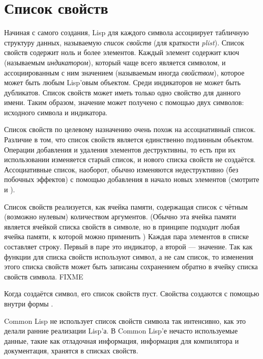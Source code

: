 \section{Список свойств}

Начиная с самого создания, Lisp для каждого символа ассоциирует табличную
структуру данных, называемую \emph{список свойств} (для краткости \emph{plist}).
Список свойств содержит ноль и более элементов. Каждый элемент содержит ключ
(называемым \emph{индикатором}), который чаще всего является символом, и
ассоциированным с ним значением (называемым иногда \emph{свойством}), которое
может быть любым Lisp'овым объектом.
Среди индикаторов не может быть дубликатов. Список свойств может иметь только
одно свойство для данного имени. Таким образом, значение может получено с
помощью двух символов: исходного символа и индикатора.

Список свойств по целевому назначению очень похож на ассоциативный
список. Различие в том, что список свойств является единственно подлинным
объектом. Операции добавления и удаления элементов деструктивны, то есть при их
использовании изменяется старый список, и нового списка свойств не создаётся.
Ассоциативные список, наоборот, обычно изменяются недеструктивно (без побочных
эффектов) с помощью добавления в начало новых элементов (смотрите  и
).

Список свойств реализуется, как ячейка памяти, содержащая список с чётным
(возможно нулевым) количеством аргументов.
(Обычно эта ячейка памяти является ячейкой списка свойств в символе, но в
принципе подходит любая ячейка памяти, к которой можно применить )
Каждая пара элементов в списке составляет строку.
Первый в паре это индикатор, а второй --- значение. Так как функции для списка
свойств используют символ, а не сам список, то изменения этого списка свойств
может быть записаны сохранением обратно в ячейку списка свойств символа. FIXME

Когда создаётся символ, его список свойств пуст. Свойства создаются с помощью
 внутри формы .

Common Lisp не использует список свойств символа так интенсивно, как это делали
ранние реализации Lisp'а. В Common Lisp'е нечасто используемые данные, такие как
отладочная информация, информация для компилятора и документация, хранятся в списках
свойств.

